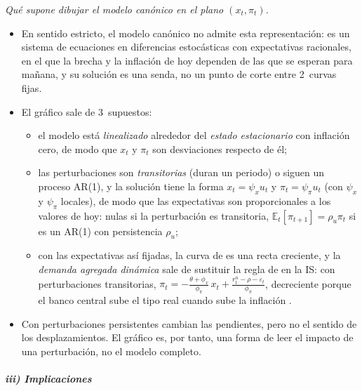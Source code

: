 \documentclass[11pt]{article}
\begin{document}
\begin{anotaciones}
\emph{Qué supone dibujar el modelo canónico en el plano $(x_t,\pi_t)$.}
\begin{itemize}
\item En sentido estricto, el modelo canónico no admite esta representación: es un sistema de ecuaciones en diferencias estocásticas con expectativas racionales, en el que la brecha y la inflación de hoy dependen de las que se esperan para mañana, y su solución es una senda, no un punto de corte entre 2~curvas fijas.
\item El gráfico sale de 3~supuestos:
  \begin{itemize}
  \item el modelo está \emph{linealizado} alrededor del \emph{estado estacionario} con inflación cero, de modo que $x_t$ y $\pi_t$ son desviaciones respecto de él;
  \item las perturbaciones son \emph{transitorias} (duran un periodo) o siguen un proceso AR(1), y la solución tiene la forma $x_t=\psi_x u_t$ y $\pi_t=\psi_\pi u_t$ (con $\psi_x$ y $\psi_\pi$ locales), de modo que las expectativas son proporcionales a los valores de hoy: nulas si la perturbación es transitoria, $\mathbb{E}_t[\pi_{t+1}]=\rho_u\pi_t$ si es un AR(1) con persistencia $\rho_u$;
  \item con las expectativas así fijadas, la curva de  es una recta creciente, y la \emph{demanda agregada dinámica} sale de sustituir la regla de  en la IS: con perturbaciones transitorias, $\pi_t=-\frac{\theta+\phi_x}{\phi_\pi}\,x_t+\frac{r^n_t-\rho-\varepsilon_t}{\phi_\pi}$, decreciente porque el banco central sube el tipo real cuando sube la inflación .
  \end{itemize}
\item Con perturbaciones persistentes cambian las pendientes, pero no el sentido de los desplazamientos. El gráfico es, por tanto, una forma de leer el impacto de una perturbación, no el modelo completo.
\end{itemize}
\end{anotaciones}

\subparagraph{iii) Implicaciones}
\end{document}

